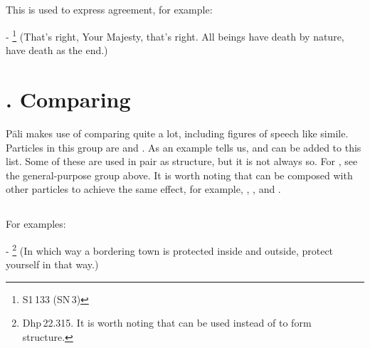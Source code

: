 \subsection*{}\label{nip:evametadm}
This is used to express agreement, for example:\par
- \footnote{S1\,133 (SN\,3)} (That's right, Your Majesty, that's right. All beings have death by nature, have death as the end.) \par

\label{nipgrp11}
\section*{. Comparing}\label{sec:nip-comparing}

P\=ali makes use of comparing quite a lot, including figures of speech like simile. Particles in this group are  and . As an example tells us,  and  can be added to this list. Some of these are used in pair as  structure, but it is not always so. For , see the general-purpose group above. It is worth noting that  can be composed with other particles to achieve the same effect, for example, , , and .

\subsection*{}\label{nip:yathaa2}\label{nip:tathaa}
For examples:\par
- \footnote{Dhp\,22.315. It is worth noting that  can be used instead of  to form  structure.} (In which way a bordering town is protected inside and outside, protect yourself in that way.) \par

